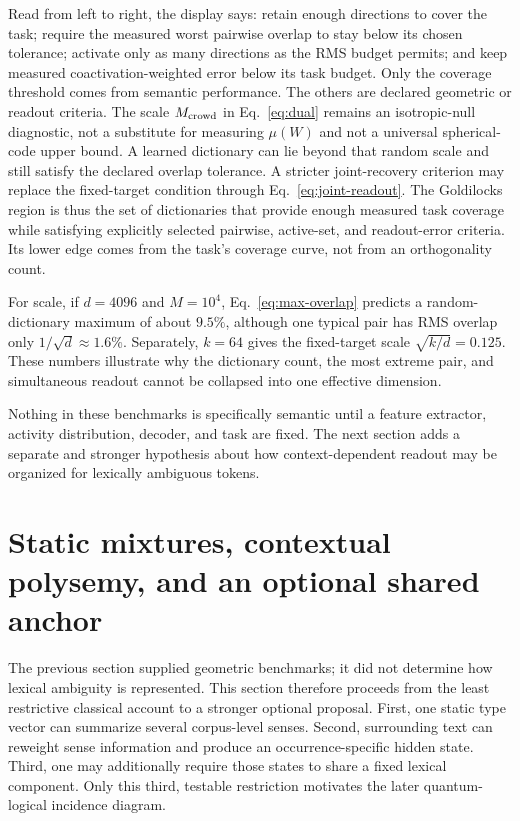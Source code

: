 \documentclass[
  aps,
  reprint,
  superscriptaddress,
  floatfix,
  nofootinbib,
  longbibliography
]{revtex4-2}
\newcommand{\Msem}{M}
\begin{document}
Read from left to right, the display says: retain enough directions to cover
the task; require the measured worst pairwise overlap to stay below its chosen
tolerance; activate only as many directions as the RMS budget permits; and
keep measured coactivation-weighted error below its task budget.  Only the
coverage threshold comes from semantic performance.  The others are declared
geometric or readout criteria.
The scale $M_{\rm crowd}$ in Eq.~\eqref{eq:dual} remains an isotropic-null
diagnostic, not a substitute for measuring $\mu(W)$ and not a universal
spherical-code upper bound.  A learned dictionary can lie beyond that random
scale and still satisfy the declared overlap tolerance.  A stricter
joint-recovery criterion may replace the fixed-target condition through
Eq.~\eqref{eq:joint-readout}.  The Goldilocks region is thus the set of
dictionaries that provide enough measured task coverage while satisfying
explicitly selected pairwise, active-set, and readout-error criteria.  Its
lower edge comes from the task's coverage curve, not from an orthogonality
count.

For scale, if $d=4096$ and $\Msem=10^4$, Eq.~\eqref{eq:max-overlap} predicts a
random-dictionary maximum of about $9.5\%$, although one typical pair has RMS
overlap only $1/\sqrt d\approx1.6\%$.  Separately, $k=64$ gives the
fixed-target scale $\sqrt{k/d}=0.125$.  These numbers illustrate why the
dictionary count, the most extreme pair, and simultaneous readout cannot be
collapsed into one effective dimension.

Nothing in these benchmarks is specifically semantic until a feature
extractor, activity distribution, decoder, and task are fixed.  The next
section adds a separate and stronger hypothesis about how context-dependent
readout may be organized for lexically ambiguous tokens.

\section{Static mixtures, contextual polysemy, and an optional shared anchor}
\label{sec:reference}

The previous section supplied geometric benchmarks; it did not determine how
lexical ambiguity is represented.  This section therefore proceeds from the
least restrictive classical account to a stronger optional proposal.  First,
one static type vector can summarize several corpus-level senses.  Second,
surrounding text can reweight sense information and produce an
occurrence-specific hidden state.  Third, one may additionally require those
states to share a fixed lexical component.  Only this third, testable
restriction motivates the later quantum-logical incidence diagram.
\end{document}
